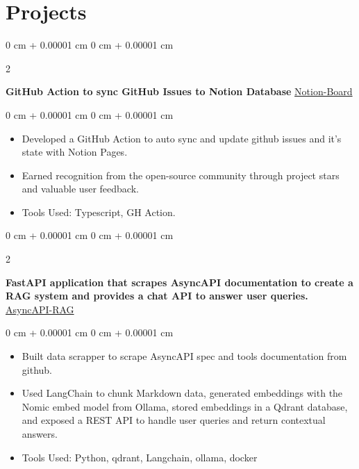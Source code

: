 \documentclass[10pt, letterpaper]{article}
\newenvironment{highlights}{
    \begin{itemize}[
        topsep=0.10 cm,
        parsep=0.10 cm,
        partopsep=0pt,
        itemsep=0pt,
        leftmargin=0 cm + 10pt
    ]
}{
    \end{itemize}
} %
\newenvironment{onecolentry}{
    \begin{adjustwidth}{
        0 cm + 0.00001 cm
    }{
        0 cm + 0.00001 cm
    }
}{
    \end{adjustwidth}
} %
\newenvironment{twocolentry}[2][]{
    \onecolentry
    \def\secondColumn{#2}
    \setcolumnwidth{\fill, 4.5 cm}
    \begin{paracol}{2}
}{
    \switchcolumn \raggedleft \secondColumn
    \end{paracol}
    \endonecolentry
} %
\begin{document}
    \section{Projects}



        
        \begin{twocolentry}{
            \href{https://github.com/Souvikns/Notion-Board}{Notion-Board}
        }
            \textbf{GitHub Action to sync GitHub Issues to Notion Database}\end{twocolentry}

        \vspace{0.10 cm}
        \begin{onecolentry}
            \begin{highlights}
                \item Developed a GitHub Action to auto sync and update github issues and it's state with Notion Pages.
                \item Earned recognition from the open-source community through project stars and valuable user feedback.
                \item Tools Used: Typescript, GH Action.
                
            \end{highlights}
        \end{onecolentry}


        \begin{twocolentry}{
            \href{https://github.com/Souvikns/asyncapi-rag}{AsyncAPI-RAG}
        }
            \textbf{FastAPI application that scrapes AsyncAPI documentation to create a RAG system and provides a chat API to answer user queries.}\end{twocolentry}

        \vspace{0.10 cm}
        \begin{onecolentry}
            \begin{highlights}
                \item Built data scrapper to scrape AsyncAPI spec and tools documentation from github.
                \item Used LangChain to chunk Markdown data, generated embeddings with the Nomic embed model from Ollama, stored embeddings in a Qdrant database, and exposed a REST API to handle user queries and return contextual answers.
                \item Tools Used: Python, qdrant, Langchain, ollama, docker 
                
            \end{highlights}
        \end{onecolentry}
\end{document}
